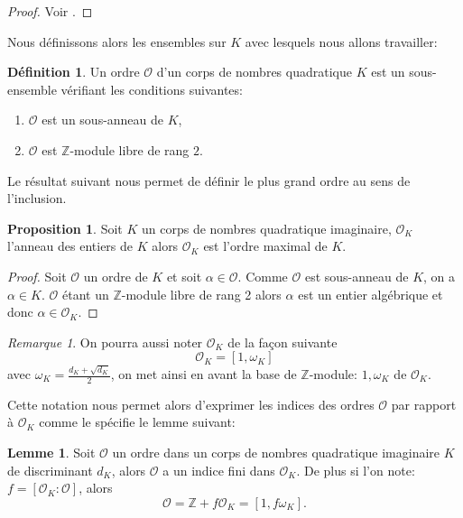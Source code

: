 \documentclass[10pt,a4paper]{book}
\theoremstyle{plain}
\theoremstyle{definition}
\theoremstyle{definition}
\newtheorem{lem}[thm]{Lemme}
\theoremstyle{definition}
\theoremstyle{definition}
\newtheorem{prop}[thm]{Proposition}
\theoremstyle{definition}
\newtheorem{defi}[thm]{Définition}
\theoremstyle{remark}
\newtheorem{rem}[thm]{Remarque}
\theoremstyle{remark}
\theoremstyle{definition}
\begin{document}
\begin{proof}
Voir \cite[exercise 5.7]{Cox89}.
\end{proof}

Nous définissons alors les ensembles sur $K$  avec lesquels nous allons travailler:

\begin{defi}
Un ordre $\mathcal{O}$ d'un corps de nombres quadratique $K$ est un 
sous-ensemble vérifiant les conditions suivantes: 
\begin{enumerate}
\item $\mathcal{O}$ est un sous-anneau de $K$,
\item $\mathcal{O}$ est $\mathbb{Z}$-module libre de rang $2$.
\end{enumerate} 
\end{defi}

Le résultat suivant nous permet de définir le plus grand ordre au sens de l'inclusion.

\begin{prop}
Soit $K$ un corps de nombres quadratique imaginaire, $\mathcal{O}_K$ l'anneau 
des entiers de $K$ alors $\mathcal{O}_K$ est l'ordre maximal de $K$.
\end{prop}

\begin{proof}
Soit $\mathcal{O}$ un ordre de $K$ et soit $\alpha \in \mathcal{O}$. Comme 
$\mathcal{O}$ est sous-anneau de $K$, on a $\alpha \in K$. $\mathcal{O}$ étant 
un $\mathbb{Z}$-module libre de rang 2 alors $\alpha$ est un entier algébrique 
et donc $\alpha \in \mathcal{O}_K$.
\end{proof}

\begin{rem}
On pourra aussi noter $\mathcal{O}_K$ de la façon suivante 
\[ \mathcal{O}_K =[1, \omega_K] \]
avec $\omega_K = \frac{d_K+\sqrt{d_K}}{2} $, on met ainsi en avant la base de $\mathbb{Z}$-module: $1, \omega_K$ de $\mathcal{O}_K$.
\end{rem}

Cette notation nous permet alors d'exprimer les indices des ordres $\mathcal{O}$ par rapport à $\mathcal{O}_K$ comme le spécifie le lemme suivant:

\begin{lem}
Soit $\mathcal{O}$ un ordre dans un corps de nombres quadratique imaginaire $K$
de discriminant $d_K$, alors $\mathcal{O}$ a un indice fini dans 
$\mathcal{O}_K$. De plus si l'on note: $f= [\mathcal{O}_K : \mathcal{O}]$, 
alors \[ \mathcal{O} = \mathbb{Z} + f\mathcal{O}_K = [1, f\omega_K]. \]
\end{lem}
\end{document}
